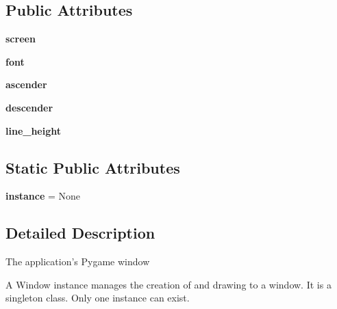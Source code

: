 \subsection*{Public Attributes}
\begin{DoxyCompactItemize}
\item 
\mbox{\label{classpygame_1_1examples_1_1playmus_1_1_window_a43cad3ecb69141402d497087b1e6ca86}} 
{\bfseries screen}
\item 
\mbox{\label{classpygame_1_1examples_1_1playmus_1_1_window_a07dbc7b79a3a31ed534848976f4f1c65}} 
{\bfseries font}
\item 
\mbox{\label{classpygame_1_1examples_1_1playmus_1_1_window_ad581f6111b0bf4a399fc30b47d8d5bf6}} 
{\bfseries ascender}
\item 
\mbox{\label{classpygame_1_1examples_1_1playmus_1_1_window_adc63e7ac569bb6a0dbbe26bab4c5de37}} 
{\bfseries descender}
\item 
\mbox{\label{classpygame_1_1examples_1_1playmus_1_1_window_a9cf39104513af69491f4e7794fcef263}} 
{\bfseries line\+\_\+height}
\end{DoxyCompactItemize}
\subsection*{Static Public Attributes}
\begin{DoxyCompactItemize}
\item 
\mbox{\label{classpygame_1_1examples_1_1playmus_1_1_window_a9fe10a64c7130cc545254c9e60529c5a}} 
{\bfseries instance} = None
\end{DoxyCompactItemize}


\subsection{Detailed Description}
\begin{DoxyVerb}The application's Pygame window

A Window instance manages the creation of and drawing to a
window. It is a singleton class. Only one instance can exist.\end{DoxyVerb}
 

